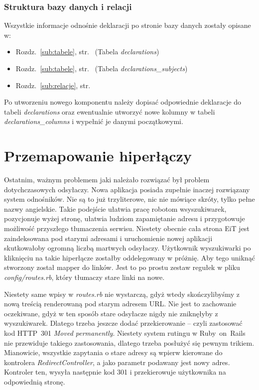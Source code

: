 \documentclass[a4paper,12pt,oneside]{report}
\begin{document}
\subsubsection{Struktura bazy danych i relacji}
Wszystkie informacje odnośnie deklaracji po stronie bazy danych zostały opisane w:
\begin{itemize}
  \item Rozdz.~\ref{sub:tabele}, str.~\pageref{subsub:declarations} (Tabela \emph{declarations})
  \item Rozdz.~\ref{sub:tabele}, str.~\pageref{subsub:declarations_subjects} (Tabela \emph{declarations\_subjects})
  \item Rozdz.~\ref{sub:relacje}, str.~\pageref{subsub:declarations-declarations_subjects}
\end{itemize}

Po utworzeniu nowego komponentu należy dopisać odpowiednie deklaracje do tabeli \emph{declarations} oraz ewentualnie utworzyć nowe kolumny w tabeli \emph{declarations\_columns} i wypełnić je danymi początkowymi.

\section{Przemapowanie hiperłączy}
\label{sec:mapa-linkow}
Ostatnim, ważnym problemem jaki należało rozwiązać był problem dotychczasowych odsyłaczy. Nowa aplikacja posiada zupełnie inaczej rozwiązany system odnośników. Nie są to już trzyliterowe, nic nie mówiące skróty, tylko pełne nazwy angielskie. Takie podejście ułatwia pracę robotom wsyszukiwarek, pozycjonuje wyżej stronę, ułatwia ludziom zapamiętanie adresu i przygotowuje możliwość przyszłego tłumaczenia serwisu. Niestety obecnie cała strona EiT jest zaindeksowana pod starymi adresami i uruchomienie nowej aplikacji skutkowałoby ogromną liczbą martwych odsyłaczy. Użytkownik wyszukiwarki po kliknięciu na takie hiperłącze zostałby oddelegowany w próżnię. Aby tego uniknąć stworzony został mapper do linków. Jest to po prostu zestaw regułek w pliku \emph{config/routes.rb}, który tłumaczy stare linki na nowe.

Niestety same wpisy w \emph{routes.rb} nie wystarczą, gdyż wtedy skończylibyśmy z nową treścią renderowaną pod starym adresem URL. Nie jest to zachowanie oczekiwane, gdyż w ten sposób stare odsyłacze nigdy nie zniknęłyby z wyszukiwarek. Dlatego trzeba jeszcze dodać przekierowanie -- czyli zastosować kod HTTP~301 \emph{Moved permanently}. Niestety system rutingu w Ruby~on~Rails nie przewiduje takiego zastosowania, dlatego trzeba posłużyć się pewnym trikiem. Mianowicie, wszystkie zapytania o stare adresy są wpierw kierowane do kontrolera \emph{RedirectController}, a jako parametr podawany jest nowy adres. Kontroler ten, wysyła następnie kod 301 i przekierowuje użytkownika na odpowiednią stronę.
\end{document}
